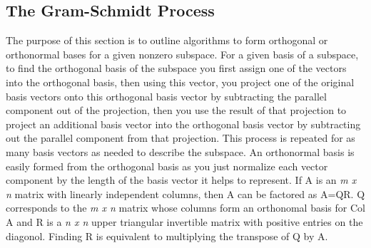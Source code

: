 \documentclass[12pt]{article}
\begin{document}
\subsection{The Gram-Schmidt Process}
The purpose of this section is to outline algorithms to form orthogonal or orthonormal bases for a given nonzero subspace. For a given basis of a subspace, to find the orthogonal basis 
of the subspace you first assign one of the vectors into the orthogonal basis, then using this vector, you project one of the original basis vectors onto this orthogonal basis vector 
by subtracting the parallel component out of the projection, then you use the result of that projection to project an additional basis vector into the orthogonal basis vector by 
subtracting out the parallel component from that projection. This process is repeated for as many basis vectors as needed to describe the subspace. An orthonormal basis is easily formed 
from the orthogonal basis as you just normalize each vector component by the length of the basis vector it helps to represent. 
\newline
\newline
If A is an \textit{m x n} matrix with linearly independent columns, then A can be factored as A=QR. Q corresponds to the \textit{m x n} matrix whose columns form an orthonomal basis for 
Col A and R is a \textit{n x n} upper triangular invertible matrix with positive entries on the diagonol. Finding R is equivalent to multiplying the transpose of Q by A. 
\end{document}
